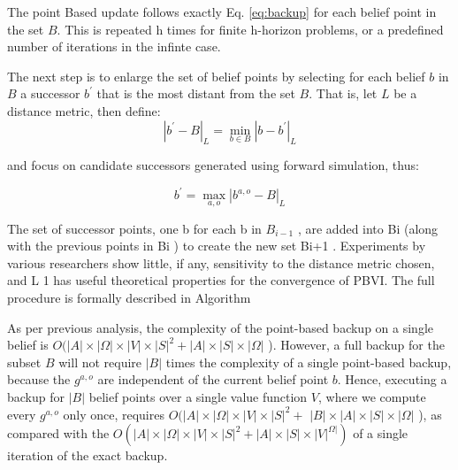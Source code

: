 The point Based update follows exactly Eq. \ref{eq:backup} for each belief point in the set $B$. 
This is repeated h times for finite h-horizon problems, or a predefined number of iterations in the 
infinte case.

The next step is to enlarge the set of belief points by selecting for each belief \(b\) in \(B\) 
a successor \(b^{\prime}\) that is the most distant from the set \(B\). That is, let \(L\) be a 
distance metric, then define:
\[
\left|b^{\prime}-B\right|_{L}=\min _{b \in B}\left|b-b^{\prime}\right|_{L}
\]

and focus on candidate successors generated using forward simulation, thus:

\[
b^{\prime}=\max _{a, o}\left|b^{a, o}-B\right|_{L}
\] 

The set of successor points, one b for each b in $B_{i-1}$ , are added into Bi (along with the previous
points in Bi ) to create the new set Bi+1 . Experiments by various researchers show little, if
any, sensitivity to the distance metric chosen, and L 1 has useful theoretical properties for the
convergence of PBVI. The full procedure is formally described in Algorithm



As per previous analysis, the complexity of the point-based backup on a single belief is 
\(O(|A| \times|\Omega| \times|V| \times|S|^{2}+|A| \times|S| \times|\Omega|\) ).
However, a full backup for the subset \(B\) will not require \(|B|\) times the complexity of a
single point-based backup, because the \(g^{a, o}\) are independent of the current belief point \(b\).
Hence, executing a backup for \(|B|\) belief points over a single value function \(V\), where we
compute every \(g^{a, o}\) only once, requires \(O(|A| \times|\Omega| \times|V| \times|S|^{2}+\)
\(|B| \times|A| \times|S| \times|\Omega|\) ), as compared with the \(O(|A| \times|\Omega| \times|V| \times|S|^{2}+|A| \times|S| \times|V|^{\Omega|})\)
of a single iteration of the exact backup. 


